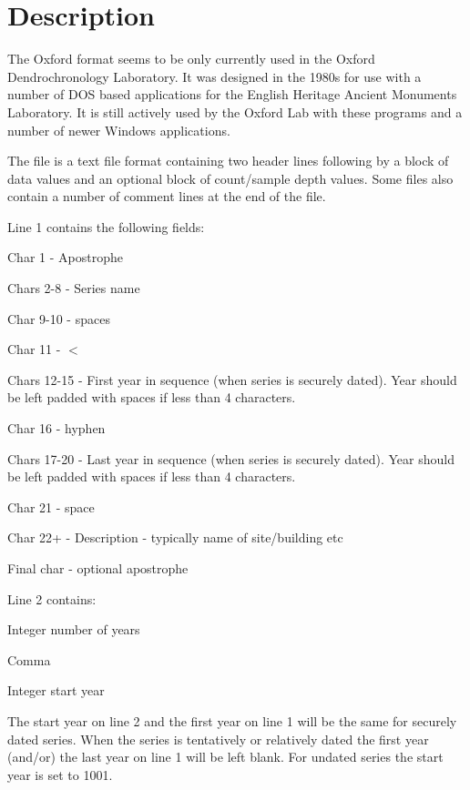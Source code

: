 \section{Description}

The Oxford format seems to be only currently used in the Oxford Dendrochronology Laboratory. It was designed in the 1980s for use with a number of DOS based applications for the English Heritage Ancient Monuments Laboratory. It is still actively used by the Oxford Lab with these programs and a number of newer Windows applications.

The file is a text file format containing two header lines following by a block of data values and an optional block of count/sample depth values. Some files also contain a number of comment lines at the end of the file.

Line 1 contains the following fields: 

\begin{itemize*}
 \item Char 1 - Apostrophe
 \item Chars 2-8 - Series name
 \item Char 9-10 - spaces
 \item Char 11 - $<$
 \item Chars 12-15 - First year in sequence (when series is securely dated).  Year should be left padded with spaces if less than 4 characters.
 \item Char 16 - hyphen
 \item Chars 17-20 - Last year in sequence (when series is securely dated).  Year should be left padded with spaces if less than 4 characters.
 \item Char 21 - space
 \item Char 22+ - Description - typically name of site/building etc
 \item Final char - optional apostrophe 
\end{itemize*}

Line 2 contains:

\begin{itemize*}
 \item Integer number of years
 \item Comma
 \item Integer start year
\end{itemize*}


The start year on line 2 and the first year on line 1 will be the same for securely dated series. When the series is tentatively or relatively dated the first year (and/or) the last year on line 1 will be left blank. For undated series the start year is set to 1001.


